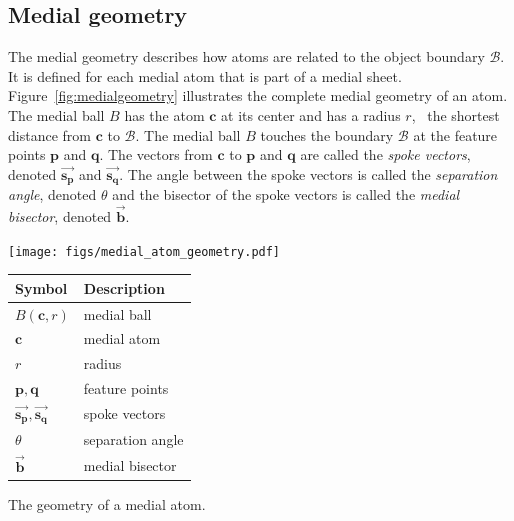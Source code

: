 \subsection{Medial geometry}
The medial geometry describes how atoms are related to the object boundary $\mathcal{B}$. 
It is defined for each medial atom that is part of a medial sheet. 
Figure~\ref{fig:medialgeometry} illustrates the complete medial geometry of an atom.
The medial ball $B$ has the atom $\mathbf{c}$ at its center and has a radius $r$, \ie\ the shortest distance from $\mathbf{c}$ to $\mathcal{B}$.
The medial ball $B$ touches the boundary $\mathcal{B}$ at the feature points $\mathbf{p}$ and $\mathbf{q}$.
The vectors from $\mathbf{c}$ to $\mathbf{p}$ and $\mathbf{q}$ are called the \emph{spoke vectors}, denoted $\vec{\mathbf{s_{p}}}$ and $\vec{\mathbf{s_{q}}}$. 
The angle between the spoke vectors is called the \emph{separation angle}, denoted $\theta$ and the bisector of the spoke vectors is called the \emph{medial bisector}, denoted $\vec{\mathbf{b}}$.

\begin{marginfigure}
	\centering
	\begin{minipage}[c]{\linewidth}
		\texttt{[image: figs/medial\_atom\_geometry.pdf]}
		\vspace{0.1em}
	\end{minipage}
	\begin{minipage}[c]{\textwidth}
		\centering
		\begin{tabular}{ll}
			\toprule
			Symbol & Description \\
			\midrule
			$B(\mathbf{c},r)$& medial ball\\
			$\mathbf{c}$ & medial atom\\
			$r$ & radius\\
			$\mathbf{p}, \mathbf{q}$ & feature points\\
			$\vec{\mathbf{s_{p}}}, \vec{\mathbf{s_{q}}}$ & spoke vectors\\
			$\theta$ & separation angle\\
			$\vec{\mathbf{b}}$ & medial bisector\\
			\bottomrule
		\end{tabular}
	\end{minipage}
	\caption{The geometry of a medial atom.}
	\label{fig:medialgeometry}
\end{marginfigure}

